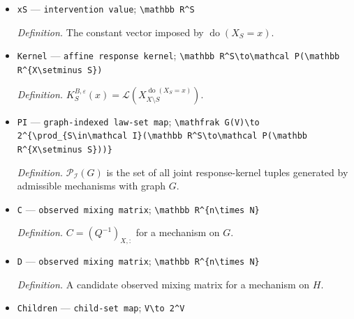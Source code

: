 \documentclass{article}
\begin{document}
\begin{itemize}
  \par\smallskip\noindent\emph{Definition.} \texttt{A set of intervened observed coordinates.}
  \item \texttt{xS} --- \texttt{intervention value}; \texttt{\textbackslash{}\allowbreak{}mathbb R\textasciicircum{}S}
  \par\smallskip\noindent\emph{Definition.} The constant vector imposed by \(\operatorname{do}(X_S=x)\).
  \item \texttt{Kernel} --- \texttt{affine response kernel}; \texttt{\textbackslash{}\allowbreak{}mathbb R\textasciicircum{}S\textbackslash{}\allowbreak{}to\textbackslash{}\allowbreak{}mathcal P(\textbackslash{}\allowbreak{}mathbb R\textasciicircum{}\{X\textbackslash{}\allowbreak{}setminus S\}\allowbreak{})}
  \par\smallskip\noindent\emph{Definition.} \(K_S^{B,\varepsilon}(x)=\mathcal L(X_{X\setminus S}^{\operatorname{do}(X_S=x)})\).
  \item \texttt{PI} --- \texttt{graph-\allowbreak{}indexed law-\allowbreak{}set map}; \texttt{\textbackslash{}\allowbreak{}mathfrak G(V)\textbackslash{}\allowbreak{}to 2\textasciicircum{}\{\textbackslash{}\allowbreak{}prod\_\allowbreak{}\{S\textbackslash{}\allowbreak{}in\textbackslash{}\allowbreak{}mathcal I\}\allowbreak{}(\textbackslash{}\allowbreak{}mathbb R\textasciicircum{}S\textbackslash{}\allowbreak{}to\textbackslash{}\allowbreak{}mathcal P(\textbackslash{}\allowbreak{}mathbb R\textasciicircum{}\{X\textbackslash{}\allowbreak{}setminus S\}\allowbreak{}))\}\allowbreak{}}
  \par\smallskip\noindent\emph{Definition.} \(\mathcal P_{\mathcal I}(G)\) is the set of all joint response-kernel tuples generated by admissible mechanisms with graph \(G\).
  \item \texttt{C} --- \texttt{observed mixing matrix}; \texttt{\textbackslash{}\allowbreak{}mathbb R\textasciicircum{}\{n\textbackslash{}\allowbreak{}times N\}\allowbreak{}}
  \par\smallskip\noindent\emph{Definition.} \(C=(Q^{-1})_{X,:}\) for a mechanism on \(G\).
  \item \texttt{D} --- \texttt{observed mixing matrix}; \texttt{\textbackslash{}\allowbreak{}mathbb R\textasciicircum{}\{n\textbackslash{}\allowbreak{}times N\}\allowbreak{}}
  \par\smallskip\noindent\emph{Definition.} A candidate observed mixing matrix for a mechanism on \(H\).
  \item \texttt{Children} --- \texttt{child-\allowbreak{}set map}; \texttt{V\textbackslash{}\allowbreak{}to 2\textasciicircum{}V}

\end{itemize}
\end{document}
